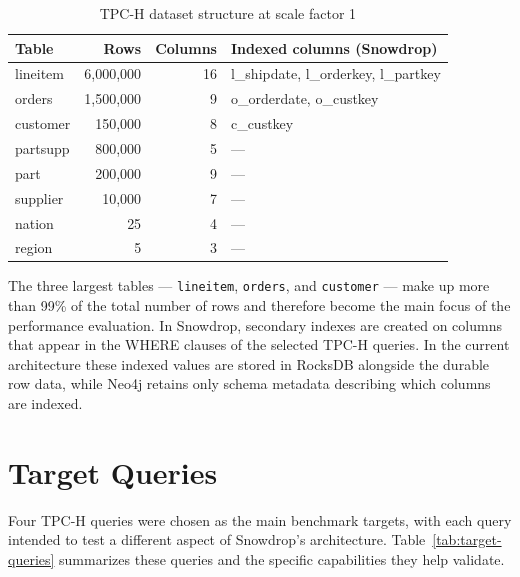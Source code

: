 \begin{table}[H]
\centering
\caption{TPC-H dataset structure at scale factor 1}
\label{tab:tpch-schema}
\renewcommand{\arraystretch}{1.4}
\begin{tabular}{|l|r|r|l|}
\hline
\textbf{Table} & \textbf{Rows} & \textbf{Columns} & \textbf{Indexed columns (Snowdrop)} \\
\hline
lineitem  & 6,000,000 & 16 & l\_shipdate, l\_orderkey, l\_partkey \\
\hline
orders    & 1,500,000 & 9  & o\_orderdate, o\_custkey \\
\hline
customer  & 150,000   & 8  & c\_custkey \\
\hline
partsupp  & 800,000   & 5  & --- \\
\hline
part      & 200,000   & 9  & --- \\
\hline
supplier  & 10,000    & 7  & --- \\
\hline
nation    & 25        & 4  & --- \\
\hline
region    & 5         & 3  & --- \\
\hline
\end{tabular}
\end{table}

The three largest tables --- \texttt{lineitem}, \texttt{orders}, and \texttt{customer} --- make up more than 99\% of the total number of rows and therefore become the main focus of the performance evaluation. In Snowdrop, secondary indexes are created on columns that appear in the WHERE clauses of the selected TPC-H queries. In the current architecture these indexed values are stored in RocksDB alongside the durable row data, while Neo4j retains only schema metadata describing which columns are indexed.

\section{Target Queries}

Four TPC-H queries were chosen as the main benchmark targets, with each query intended to test a different aspect of Snowdrop’s architecture. Table~\ref{tab:target-queries} summarizes these queries and the specific capabilities they help validate.

